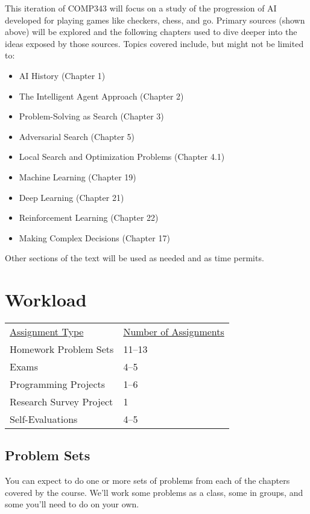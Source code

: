 \documentclass[10pt]{article}
\begin{document}
This iteration of COMP343 will focus on a study of the progression of AI developed for playing games like checkers, chess, and go. Primary sources (shown above) will be explored and the following chapters used to dive deeper into the ideas exposed by those sources. Topics covered include, but might not be limited to:
\begin{itemize}
\item AI History (Chapter 1) %
\item The Intelligent Agent Approach (Chapter 2) %
\item Problem-Solving as Search (Chapter 3) %
\item Adversarial Search (Chapter 5) %
\item Local Search and Optimization Problems (Chapter 4.1)
\item Machine Learning (Chapter 19)
\item Deep Learning (Chapter 21)
\item Reinforcement Learning (Chapter 22)
\item Making Complex Decisions (Chapter 17) 
\end{itemize}
Other sections of the text will be used as needed and as time permits.


\section{Workload}


\begin{center}
  \begin{tabular}{ll}
    \underline{Assignment Type} & \underline{Number of Assignments} \\
    Homework Problem Sets & 11--13 \\
    Exams & 4--5 \\
    Programming Projects & 1--6 \\
    Research Survey Project & 1 \\
    Self-Evaluations & 4--5 \\
  \end{tabular}
\end{center}

\subsection*{Problem Sets}

You can expect to do one or more sets of problems from each of the chapters covered by the course. We'll work some problems as a class, some in groups, and some you'll need to do on your own.
\end{document}
